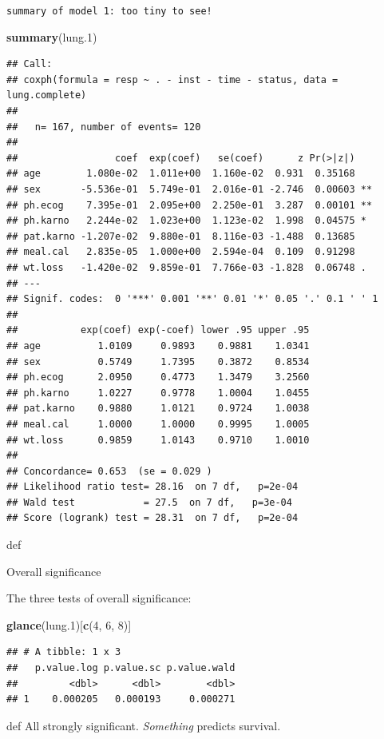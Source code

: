 \documentclass[ignorenonframetext,]{beamer}
\newenvironment{Shaded}{\begin{snugshade}}{\end{snugshade}}
\newcommand{\DecValTok}[1]{\textcolor[rgb]{0.00,0.00,0.81}{#1}}
\newcommand{\FloatTok}[1]{\textcolor[rgb]{0.00,0.00,0.81}{#1}}
\newcommand{\KeywordTok}[1]{\textcolor[rgb]{0.13,0.29,0.53}{\textbf{#1}}}
\newcommand{\NormalTok}[1]{#1}
\begin{document}
\begin{frame}[fragile]{\texttt{summary\ of\ model\ 1:\ too\ tiny\ to\ see!}}
\protect\hypertarget{summary-of-model-1-too-tiny-to-see}{}

\begin{Shaded}
\begin{Highlighting}[]
\KeywordTok{summary}\NormalTok{(lung}\FloatTok{.1}\NormalTok{)}
\end{Highlighting}
\end{Shaded}

\begin{verbatim}
## Call:
## coxph(formula = resp ~ . - inst - time - status, data = lung.complete)
## 
##   n= 167, number of events= 120 
## 
##                 coef  exp(coef)   se(coef)      z Pr(>|z|)   
## age        1.080e-02  1.011e+00  1.160e-02  0.931  0.35168   
## sex       -5.536e-01  5.749e-01  2.016e-01 -2.746  0.00603 **
## ph.ecog    7.395e-01  2.095e+00  2.250e-01  3.287  0.00101 **
## ph.karno   2.244e-02  1.023e+00  1.123e-02  1.998  0.04575 * 
## pat.karno -1.207e-02  9.880e-01  8.116e-03 -1.488  0.13685   
## meal.cal   2.835e-05  1.000e+00  2.594e-04  0.109  0.91298   
## wt.loss   -1.420e-02  9.859e-01  7.766e-03 -1.828  0.06748 . 
## ---
## Signif. codes:  0 '***' 0.001 '**' 0.01 '*' 0.05 '.' 0.1 ' ' 1
## 
##           exp(coef) exp(-coef) lower .95 upper .95
## age          1.0109     0.9893    0.9881    1.0341
## sex          0.5749     1.7395    0.3872    0.8534
## ph.ecog      2.0950     0.4773    1.3479    3.2560
## ph.karno     1.0227     0.9778    1.0004    1.0455
## pat.karno    0.9880     1.0121    0.9724    1.0038
## meal.cal     1.0000     1.0000    0.9995    1.0005
## wt.loss      0.9859     1.0143    0.9710    1.0010
## 
## Concordance= 0.653  (se = 0.029 )
## Likelihood ratio test= 28.16  on 7 df,   p=2e-04
## Wald test            = 27.5  on 7 df,   p=3e-04
## Score (logrank) test = 28.31  on 7 df,   p=2e-04
\end{verbatim}

def

\end{frame}

\begin{frame}[fragile]{Overall significance}
\protect\hypertarget{overall-significance}{}

The three tests of overall significance:

\begin{Shaded}
\begin{Highlighting}[]
\KeywordTok{glance}\NormalTok{(lung}\FloatTok{.1}\NormalTok{)[}\KeywordTok{c}\NormalTok{(}\DecValTok{4}\NormalTok{, }\DecValTok{6}\NormalTok{, }\DecValTok{8}\NormalTok{)]}
\end{Highlighting}
\end{Shaded}

\begin{verbatim}
## # A tibble: 1 x 3
##   p.value.log p.value.sc p.value.wald
##         <dbl>      <dbl>        <dbl>
## 1    0.000205   0.000193     0.000271
\end{verbatim}

def All strongly significant. \emph{Something} predicts survival.

\end{frame}
\end{document}
